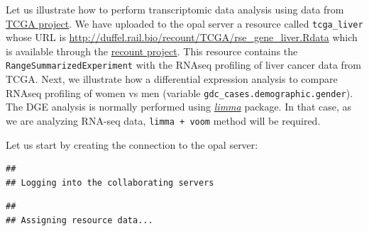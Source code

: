 \documentclass[
]{book}
\newenvironment{Shaded}{\begin{snugshade}}{\end{snugshade}}
\newcommand{\AttributeTok}[1]{\textcolor[rgb]{0.77,0.63,0.00}{#1}}
\newcommand{\ConstantTok}[1]{\textcolor[rgb]{0.00,0.00,0.00}{#1}}
\newcommand{\FunctionTok}[1]{\textcolor[rgb]{0.00,0.00,0.00}{#1}}
\newcommand{\NormalTok}[1]{#1}
\newcommand{\OtherTok}[1]{\textcolor[rgb]{0.56,0.35,0.01}{#1}}
\newcommand{\SpecialCharTok}[1]{\textcolor[rgb]{0.00,0.00,0.00}{#1}}
\newcommand{\StringTok}[1]{\textcolor[rgb]{0.31,0.60,0.02}{#1}}
\begin{document}
Let us illustrate how to perform transcriptomic data analysis using data from \href{https://www.cancer.gov/about-nci/organization/ccg/research/structural-genomics/tcga}{TCGA project}. We have uploaded to the opal server a resource called \texttt{tcga\_liver} whose URL is \url{http://duffel.rail.bio/recount/TCGA/rse_gene_liver.Rdata} which is available through the \href{https://jhubiostatistics.shinyapps.io/recount/}{recount project}. This resource contains the \texttt{RangeSummarizedExperiment} with the RNAseq profiling of liver cancer data from TCGA. Next, we illustrate how a differential expression analysis to compare RNAseq profiling of women vs men (variable \texttt{gdc\_cases.demographic.gender}). The DGE analysis is normally performed using \emph{\href{https://bioconductor.org/packages/3.12/limma}{limma}} package. In that case, as we are analyzing RNA-seq data, \texttt{limma\ +\ voom} method will be required.

Let us start by creating the connection to the opal server:

\begin{Shaded}
\end{Shaded}

\begin{verbatim}
## 
## Logging into the collaborating servers
\end{verbatim}

\begin{verbatim}
## 
## Assigning resource data...
\end{verbatim}
\end{document}
